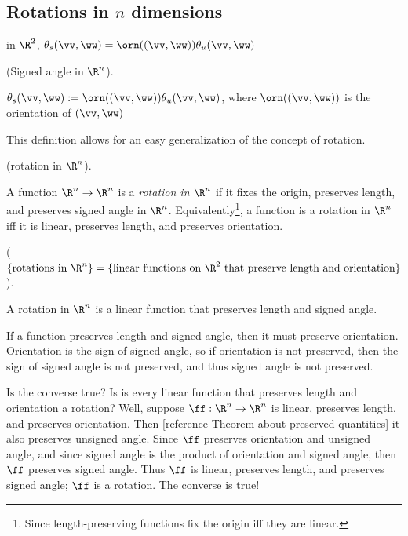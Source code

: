 \subsection*{Rotations in $n$ dimensions}

\begin{theorem}
    in $\R^2$, $\theta_s(\vv, \ww) = \orn((\vv, \ww)) \theta_u(\vv, \ww)$
\end{theorem}

\begin{defn}
    (Signed angle in $\R^n$).

    $\theta_s(\vv, \ww) := \orn((\vv, \ww)) \theta_u(\vv, \ww)$, where $\orn((\vv, \ww))$ is the orientation of $(\vv, \ww)$
\end{defn}

This definition allows for an easy generalization of the concept of rotation.

\begin{defn}
    (rotation in $\R^n$).

    A function $\R^n \rightarrow \R^n$ is a \textit{rotation in $\R^n$} if it fixes the origin, preserves length, and preserves signed angle in $\R^n$. Equivalently\footnote{Since length-preserving functions fix the origin iff they are linear.}, a function is a rotation in $\R^n$ iff it is linear, preserves length, and preserves orientation. 
\end{defn}

\begin{deriv}
    ($\{\text{rotations in $\R^n$}\} = \{ \text{linear functions on $\R^2$ that preserve length and orientation} \}$).

    A rotation in $\R^n$ is a linear function that preserves length and signed angle.

    If a function preserves length and signed angle, then it must preserve orientation. Orientation is the sign of signed angle, so if orientation is not preserved, then the sign of signed angle is not preserved, and thus signed angle is not preserved.
    
    Is the converse true? Is is every linear function that preserves length and orientation a rotation? Well, suppose $\ff:\R^n \rightarrow \R^n$ is linear, preserves length, and preserves orientation. Then [reference Theorem about preserved quantities] it also preserves unsigned angle. Since $\ff$ preserves orientation and unsigned angle, and since signed angle is the product of orientation and signed angle, then $\ff$ preserves signed angle. Thus $\ff$ is linear, preserves length, and preserves signed angle; $\ff$ is a rotation. The converse is true!
\end{deriv}

